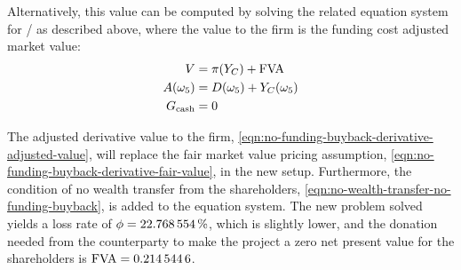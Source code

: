 \documentclass[../main.tex]{subfiles}
\begin{document}
            Alternatively, this value can be computed by solving the related equation system for \FCA/ as described above, where the value to the firm is the funding  cost adjusted market value:
            \begin{align}
                V &= \pi(Y_C) + \FVA/
                \label{eqn:no-funding-buyback-derivative-adjusted-value}
                \\
                A(\omega_5) &= D(\omega_5) + Y_C(\omega_5)
                \\
                G_{\text{cash}} &= 0
                \label{eqn:no-wealth-transfer-no-funding-buyback}
            \end{align}

            The adjusted derivative value to the firm, \cref{eqn:no-funding-buyback-derivative-adjusted-value},
            will replace the fair market value pricing assumption, \cref{eqn:no-funding-buyback-derivative-fair-value}, in the new setup.
            Furthermore, the condition of no wealth transfer from the shareholders, \cref{eqn:no-wealth-transfer-no-funding-buyback}, is added to the equation system.
            The new problem solved yields a loss rate of $\phi = \pct{0.22768554}$,
            which is slightly lower,
            and the donation needed from the counterparty to make the project a zero net present value for the shareholders is $\FVA/ = \num{0.2145446}$.
\end{document}
